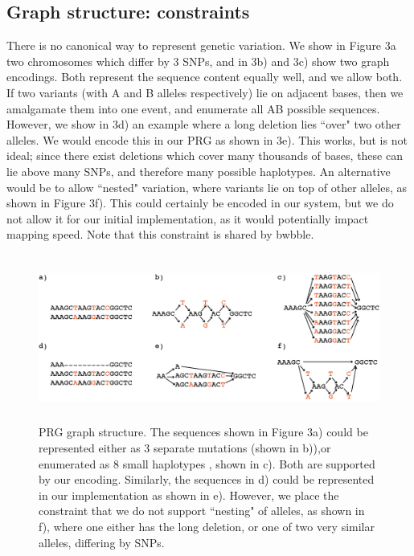 \documentclass[runningheads,a4paper]{llncs}
\begin{document}
\subsection{Graph structure: constraints}
There is no canonical way to represent genetic variation. We show in Figure 3a two chromosomes which differ by 3 SNPs, and in 3b) and 3c) show two graph encodings. Both represent the sequence content equally well, and we allow both. If two variants (with A and B alleles respectively) lie on adjacent bases, then we amalgamate them into one event, and enumerate all AB possible sequences. However, we show in 3d) an example where a long deletion lies ``over" two other alleles. We would encode this in our PRG as shown in 3e). This works, but is not ideal; since there exist deletions which cover many thousands of bases, these can lie above many SNPs, and therefore many possible haplotypes. An alternative would be to allow ``nested" variation, where variants lie on top of other alleles, as shown in Figure 3f). This could certainly be encoded in our system, but we do not allow it for our initial implementation, as it would potentially impact mapping speed. Note that this constraint is shared by bwbble.


\begin{figure}
\centering
\includegraphics[height=5.5cm]{graph_construction.png}
\caption{PRG graph structure. The sequences shown in Figure 3a) could be represented either as 3 separate mutations (shown in b)),or enumerated as 8 small haplotypes , shown in c). Both are supported by our encoding. Similarly, the sequences in d) could be represented in our implementation as shown in e). However, we place the constraint that we do not support ``nesting" of alleles, as shown in f), where one either has the long deletion, or one of two very similar alleles, differing by SNPs.}
\label{lab}
\end{figure}
\end{document}
